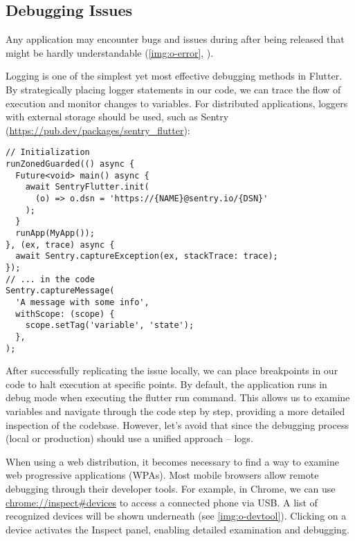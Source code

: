 
\subsection{Debugging Issues}

Any application may encounter bugs and issues during after being released that might be hardly understandable 
(\cref{img:o-error}, ).


\noindent Logging is one of the simplest yet most effective debugging methods in Flutter. By strategically placing 
logger statements in our code, we can trace the flow of execution and monitor changes to variables. For distributed 
applications, loggers with external storage should be used, such as Sentry
(\href{https://pub.dev/packages/sentry\_flutter}{https://pub.dev/packages/sentry\_flutter}):

\begin{lstlisting}
// Initialization
runZonedGuarded(() async {
  Future<void> main() async {
    await SentryFlutter.init(
      (o) => o.dsn = 'https://{NAME}@sentry.io/{DSN}'
    );
  }
  runApp(MyApp());
}, (ex, trace) async {
  await Sentry.captureException(ex, stackTrace: trace);
});
// ... in the code
Sentry.captureMessage(
  'A message with some info',
  withScope: (scope) {
    scope.setTag('variable', 'state');
  },
);
\end{lstlisting}

\noindent After successfully replicating the issue locally, we can place breakpoints in our code to halt execution at 
specific points. By default, the application runs in debug mode when executing the flutter run command. This allows us 
to examine variables and navigate through the code step by step, providing a more detailed inspection of the codebase. 
However, let's avoid that since the debugging process (local or production) should use a unified approach -- logs.

When using a web distribution, it becomes necessary to find a way to examine web progressive applications (WPAs). Most 
mobile browsers allow remote debugging through their developer tools. For example, in Chrome, we can use 
\href{chrome://inspect\#devices}{chrome://inspect\#devices} to access a connected phone via USB. A list of recognized 
devices will be shown underneath (see \cref{img:o-devtool}). Clicking on a device activates the Inspect panel, enabling 
detailed examination and debugging.

